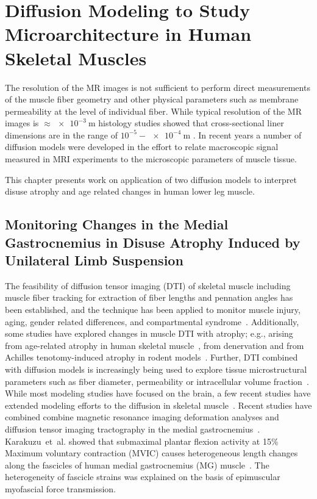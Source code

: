 \chapter{Diffusion Modeling to Study Microarchitecture in Human Skeletal Muscles}
\label{ch: DiffusionExp}
The resolution of the MR images is not sufficient to perform direct measurements of the muscle fiber geometry and other physical parameters such as membrane permeability at the level of individual fiber. 
While typical resolution of the MR images is $\approx \SI{e-3}{\m}$ histology studies showed that cross-sectional liner dimensions are in the range of $10^{-5} - \SI{e-4}{\m}$ \cite{TAYLOR200335}. 
In recent years a number of diffusion models were developed in the effort to relate macroscopic signal measured in MRI experiments to the microscopic parameters of muscle tissue. 

This chapter presents work on application of two diffusion models to interpret disuse atrophy and age related changes in human lower leg muscle.

\section{Monitoring Changes in the Medial Gastrocnemius in Disuse Atrophy Induced by Unilateral Limb Suspension}
\label{sec: DTI ULLS}
The feasibility of diffusion tensor imaging (DTI) of skeletal muscle including muscle fiber tracking for extraction of fiber lengths and pennation angles has been established, and the technique has been applied to monitor muscle injury, aging, gender related differences, and compartmental syndrome~\cite{RND1, RND2, RND3, RND4, RND5, RND6}. 
Additionally, some studies have explored changes in muscle DTI with atrophy; e.g., arising from age-related atrophy in human skeletal muscle~\cite{RND7}, from denervation and from Achilles tenotomy-induced atrophy in rodent models~\cite{RND8, RND9}.
Further, DTI combined with diffusion models is increasingly being used to explore tissue microstructural parameters such as fiber diameter, permeability or intracellular volume fraction~\cite{RND10}.
While most modeling studies have focused on the brain, a few recent studies have extended modeling efforts to the diffusion in skeletal muscle~\cite{RND11, RND12, RND13}. 
Recent studies have combined combine magnetic resonance imaging deformation analyses and diffusion tensor imaging tractography in the medial gastrocnemius~\cite{RNSS4,RNCS4}. 
Karakuzu~et~al. showed that submaximal plantar flexion activity at 15\% Maximum voluntary contraction (MVIC) causes heterogeneous length changes along the fascicles of human medial gastrocnemius (MG) muscle~\cite{RNCS4}.
The heterogeneity of fascicle strains was explained on the basis of epimuscular myofascial force transmission. 

